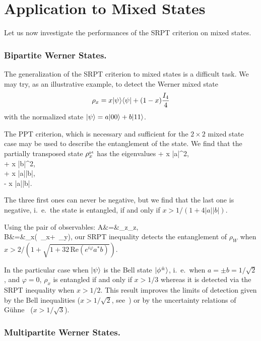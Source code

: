 \section{Application to Mixed States} \label{sec-SRPTmix}

Let us now investigate the performances of the SRPT criterion on mixed states.

\subsubsection{Bipartite Werner States.}

The generalization of the SRPT criterion to mixed states is a difficult task. We may try, as an illustrative example, to detect the Werner mixed state ~\cite{Wer89}
\[ \rho_x = x | \psi \rangle \langle \psi | +  (1-x)\frac{I_4}4\]
with the normalized state $| \psi \rangle = a | 00 \rangle + b | 11 \rangle$.

The PPT criterion, which is necessary and sufficient for the $2\times 2$ mixed state case may be used to describe the entanglement of the state. We find that the partially transposed state $\rho^{\mbox{\tiny \textup{pt}}}_x$ has the eigenvalues
\bea
{} + x |a|^2, \\
 + x |b|^2, \\
 + x |a||b|, \\
 - x |a||b|.
\eea

The three first ones can never be negative, but we find that the last one is negative, i.~e.~the state is entangled, if and only if $ x > 1 / (1+4|a||b|).$

Using the pair of observables:
\bea A&=&\sigma_z\otimes\sigma_z, \\
B&=&\sigma_x\otimes(\cos\varphi\, \sigma_x+\sin\varphi \, \sigma_y),
\eea
our SRPT inequality detects the entanglement of  $\rho_W$ when $x > 2/(1+\sqrt{1+32\, \mbox{Re}(e^{i \varphi} a^* b)})$.

In the particular case when $| \psi \rangle$ is the Bell state $| \phi^\pm \rangle$, i.~e.~when $a=\pm b = 1/ \sqrt 2$, and $\varphi=0$, $\rho_x$ is entangled if and only if $x > 1/3$ whereas it is detected via the SRPT inequality  when $x > 1/2$. This result improves the limits of detection given by the Bell inequalities ($x > 1 / {\sqrt 2}$, see~\cite{Per96}) or by the uncertainty relations of G\"uhne~\cite{Guh04} ($x> 1/{\sqrt 3}$).

\subsubsection{Multipartite Werner States.}

